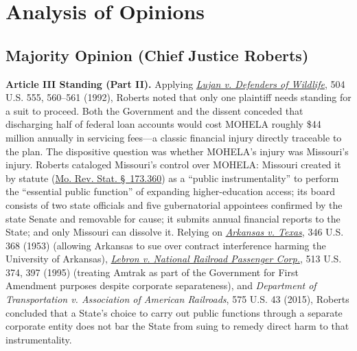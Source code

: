 \documentclass[12pt]{article}
\begin{document}
\section{Analysis of Opinions}

\subsection{Majority Opinion (Chief Justice Roberts)}

\textbf{Article III Standing (Part II).} Applying \href{https://supreme.justia.com/cases/federal/us/504/555/}{\textit{Lujan v. Defenders of Wildlife}}, 504 U.S. 555, 560--561 (1992), Roberts noted that only one plaintiff needs standing for a suit to proceed. Both the Government and the dissent conceded that discharging half of federal loan accounts would cost MOHELA roughly \$44 million annually in servicing fees---a classic financial injury directly traceable to the plan. The dispositive question was whether MOHELA's injury was Missouri's injury. Roberts cataloged Missouri's control over MOHELA: Missouri created it by statute (\href{https://revisor.mo.gov/main/PageSelect.aspx?section=173.360&bid=8823}{Mo. Rev. Stat. \S~173.360}) as a ``public instrumentality'' to perform the ``essential public function'' of expanding higher-education access; its board consists of two state officials and five gubernatorial appointees confirmed by the state Senate and removable for cause; it submits annual financial reports to the State; and only Missouri can dissolve it. Relying on \href{https://supreme.justia.com/cases/federal/us/346/368/}{\textit{Arkansas v. Texas}}, 346 U.S. 368 (1953) (allowing Arkansas to sue over contract interference harming the University of Arkansas), \href{https://supreme.justia.com/cases/federal/us/513/374/}{\textit{Lebron v. National Railroad Passenger Corp.}}, 513 U.S. 374, 397 (1995) (treating Amtrak as part of the Government for First Amendment purposes despite corporate separateness), and \textit{Department of Transportation v. Association of American Railroads}, 575 U.S. 43 (2015), Roberts concluded that a State's choice to carry out public functions through a separate corporate entity does not bar the State from suing to remedy direct harm to that instrumentality.
\end{document}
